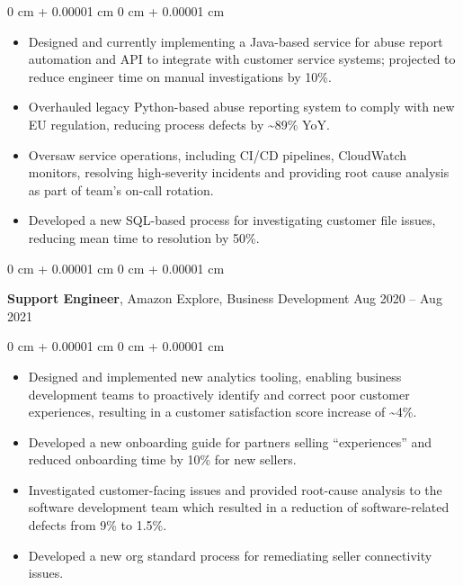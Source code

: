 \documentclass[10pt, letterpaper]{article}
\newenvironment{highlights}{
    \begin{itemize}[
        topsep=0.10 cm,
        parsep=0.10 cm,
        partopsep=0pt,
        itemsep=0pt,
        leftmargin=0 cm + 10pt
    ]
}{
    \end{itemize}
} %
\newenvironment{onecolentry}{
    \begin{adjustwidth}{
        0 cm + 0.00001 cm
    }{
        0 cm + 0.00001 cm
    }
}{
    \end{adjustwidth}
} %
\newenvironment{twocolentry}[2][]{
    \onecolentry
    \def\secondColumn{#2}
    \setcolumnwidth{\fill, 4.5 cm}
    \begin{paracol}{2}
}{
    \switchcolumn \raggedleft \secondColumn
    \end{paracol}
    \endonecolentry
} %
\begin{document}
        \vspace{0.10 cm}
        \begin{onecolentry}
            \begin{highlights}
                \item Designed and currently implementing a Java-based service for abuse report automation and API to integrate with customer service systems; projected to reduce engineer time on manual investigations by 10\%.
                \item Overhauled legacy Python-based abuse reporting system to comply with new EU regulation, reducing process defects by \textasciitilde{}89\% YoY.
                \item Oversaw service operations, including CI/CD pipelines, CloudWatch monitors, resolving high-severity incidents and providing root cause analysis as part of team’s on-call rotation.
                \item Developed a new SQL-based process for investigating customer file issues, reducing mean time to resolution by 50\%.
            \end{highlights}
        \end{onecolentry}


        \vspace{0.2 cm}

        \begin{twocolentry}{
            Aug 2020 – Aug 2021
        }
            \textbf{Support Engineer}, Amazon Explore, Business Development\end{twocolentry}

        \vspace{0.10 cm}
        \begin{onecolentry}
            \begin{highlights}
                \item Designed and implemented new analytics tooling, enabling business development teams to proactively identify and correct poor customer experiences, resulting in a customer satisfaction score increase of \textasciitilde{}4\%.
                \item Developed a new onboarding guide for partners selling “experiences” and reduced onboarding time by 10\% for new sellers.
                \item Investigated customer-facing issues and provided root-cause analysis to the software development team which resulted in a reduction of software-related defects from 9\% to 1.5\%.
                \item Developed a new org standard process for remediating seller connectivity issues.
            \end{highlights}
        \end{onecolentry}
\end{document}
